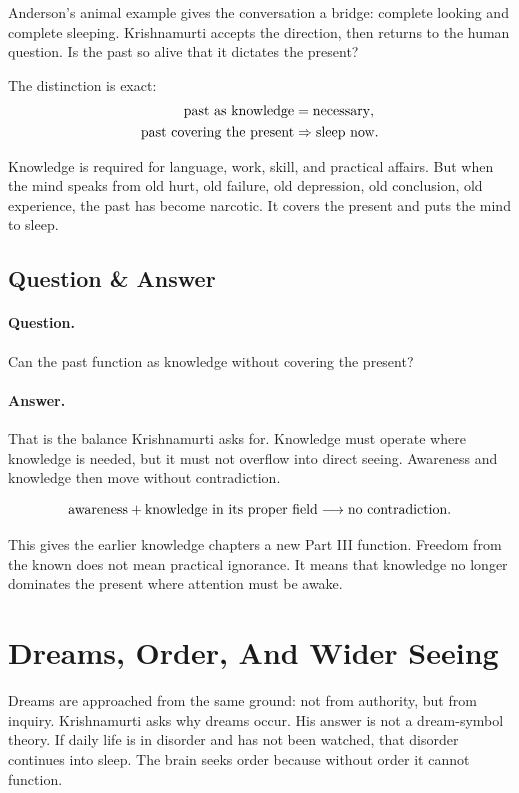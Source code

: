 \documentclass[11pt,oneside]{book}
\begin{document}
Anderson's animal example gives the conversation a bridge: complete looking and complete sleeping. Krishnamurti accepts the direction, then returns to the human question. Is the past so alive that it dictates the present?

The distinction is exact:
\begin{align}
\hbox{past as knowledge} &= \hbox{necessary},\\
\hbox{past covering the present} &\Rightarrow \hbox{sleep now}.
\end{align}

Knowledge is required for language, work, skill, and practical affairs. But when the mind speaks from old hurt, old failure, old depression, old conclusion, old experience, the past has become narcotic. It covers the present and puts the mind to sleep.

\subsection{Question \& Answer}

\paragraph{Question.}
Can the past function as knowledge without covering the present?

\paragraph{Answer.}
That is the balance Krishnamurti asks for. Knowledge must operate where knowledge is needed, but it must not overflow into direct seeing. Awareness and knowledge then move without contradiction.

\begin{equation}
\hbox{awareness}+\hbox{knowledge in its proper field}
\longrightarrow
\hbox{no contradiction}.
\end{equation}

This gives the earlier knowledge chapters a new Part III function. Freedom from the known does not mean practical ignorance. It means that knowledge no longer dominates the present where attention must be awake.

\section{Dreams, Order, And Wider Seeing}

Dreams are approached from the same ground: not from authority, but from inquiry. Krishnamurti asks why dreams occur. His answer is not a dream-symbol theory. If daily life is in disorder and has not been watched, that disorder continues into sleep. The brain seeks order because without order it cannot function.
\end{document}
